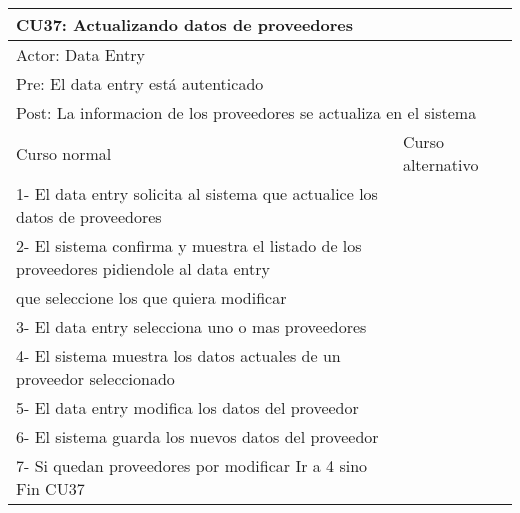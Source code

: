\begin{table}[H]
  \begin{adjustbox}{max width = \textwidth}
  \begin{tabular}{|l|l|}
    \hline
    \multicolumn{2}{|l|}{CU37: Actualizando datos de proveedores} \\\hline
    \multicolumn{2}{|l|}{Actor: Data Entry} \\\hline
    \multicolumn{2}{|l|}{Pre: El data entry está autenticado} \\\hline
    \multicolumn{2}{|l|}{Post: La informacion de los proveedores se actualiza en el sistema} \\\hline
     Curso normal & Curso alternativo\\ \hline
	 1- El data entry solicita al sistema que actualice los datos de proveedores & \\ \hline
     2- El sistema confirma y muestra el listado de los proveedores pidiendole al data entry \\ que seleccione los que quiera modificar & \\ \hline
     3- El data entry selecciona uno o mas proveedores & \\ \hline
     4- El sistema muestra los datos actuales de un proveedor seleccionado & \\ \hline
     5- El data entry modifica los datos del proveedor & \\ \hline
     6- El sistema guarda los nuevos datos del proveedor & \\ \hline
     7- Si quedan proveedores por modificar Ir a 4 sino Fin CU37 & \\ \hline
  \end{tabular}
  \end{adjustbox}
\end{table}


